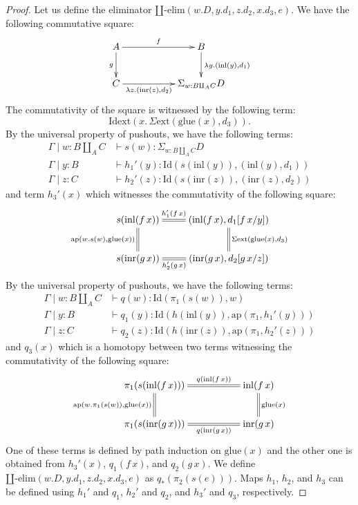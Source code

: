 \documentclass[reqno]{mscs}
\newcommand{\fs}[1]{\mathrm{#1}}
\newcommand{\Id}{\fs{Id}}
\newcommand{\pmap}{\fs{ap}}
\numberwithin{figure}{section}
\begin{document}
\begin{proof}
Let us define the eliminator $\amalg\text{-}\fs{elim}(w.D, y.d_1, z.d_2, x.d_3, e)$.
We have the following commutative square:
\[ \xymatrix{ A \ar[rr]^-f \ar[d]_g                    & & B \ar[d]^{\lambda y.(\fs{inl}(y),d_1)} \\
              C \ar[rr]_-{\lambda z.(\fs{inr}(z),d_2)} & & \Sigma_{w : B \amalg_A C} D
            } \]
The commutativity of the square is witnessed by the following term:
\[ \fs{Idext}(x.\,\Sigma\fs{ext}(\fs{glue}(x),d_3)). \]
By the universal property of pushouts, we have the following terms:
\begin{align*}
\Gamma \mid w : B \amalg_A C & \vdash s(w) : \Sigma_{w : B \amalg_A C} D \\
\Gamma \mid y : B & \vdash h_1'(y) : \Id(s(\fs{inl}(y)),(\fs{inl}(y),d_1)) \\
\Gamma \mid z : C & \vdash h_2'(z) : \Id(s(\fs{inr}(z)),(\fs{inr}(z),d_2))
\end{align*}
and term $h_3'(x)$ which witnesses the commutativity of the following square:
\[ \xymatrix{ s(\fs{inl}(f\,x)) \ar@{=}[r]^-{h_1'(f\,x)} \ar@{=}[d]_{\pmap(w.s(w),\fs{glue}(x))} & (\fs{inl}(f\,x),d_1[f\,x/y]) \ar@{=}[d]^{\Sigma\fs{ext}(\fs{glue}(x),d_3)} \\
              s(\fs{inr}(g\,x)) \ar@{=}[r]_-{h_2'(g\,x)} & (\fs{inr}(g\,x),d_2[g\,x/z])
            } \]
By the universal property of pushouts, we have the following terms:
\begin{align*}
\Gamma \mid w : B \amalg_A C & \vdash q(w) : \Id(\pi_1(s(w)),w) \\
\Gamma \mid y : B & \vdash q_1(y) : \Id(h(\fs{inl}(y)),\pmap(\pi_1,h_1'(y))) \\
\Gamma \mid z : C & \vdash q_2(z) : \Id(h(\fs{inr}(z)),\pmap(\pi_1,h_2'(z)))
\end{align*}
and $q_3(x)$ which is a homotopy between two terms witnessing the commutativity of the following square:
\[ \xymatrix{ \pi_1(s(\fs{inl}(f\,x))) \ar@{=}[rr]^-{q(\fs{inl}(f\,x))} \ar@{=}[d]_{\pmap(w.\pi_1(s(w)),\fs{glue}(x))} & & \fs{inl}(f\,x) \ar@{=}[d]^{\fs{glue}(x)} \\
              \pi_1(s(\fs{inr}(g\,x))) \ar@{=}[rr]_-{q(\fs{inr}(g\,x))}                                                & & \fs{inr}(g\,x)
            } \]
One of these terms is defined by path induction on $\fs{glue}(x)$ and the other one is obtained from $h_3'(x)$, $q_1(f\,x)$, and $q_2(g\,x)$.
We define $\amalg\text{-}\fs{elim}(w.D, y.d_1, z.d_2, x.d_3, e)$ as $q_*(\pi_2(s(e)))$.
Maps $h_1$, $h_2$, and $h_3$ can be defined using $h_1'$ and $q_1$, $h_2'$ and $q_2$, and $h_3'$ and $q_3$, respectively.
\end{proof}
\end{document}
